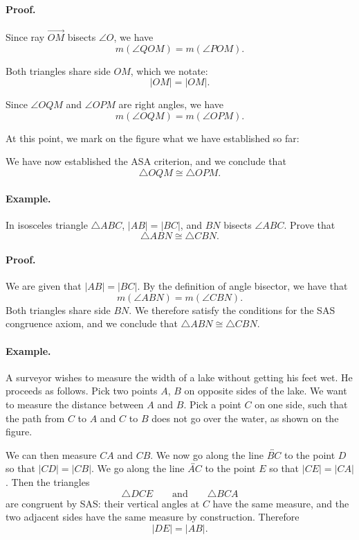 \documentclass[12pt]{book} %
\begin{document}

\paragraph{Proof.}
Since ray $\overrightarrow{OM}$ bisects $\angle O$, we have
\[
m(\angle QOM)=m(\angle POM).
\]

Both triangles share side $OM$, which we notate:
\[
|OM|=|OM|.
\]

Since $\angle OQM$ and $\angle OPM$ are right angles, we have
\[
m(\angle OQM)=m(\angle OPM).
\]

At this point, we mark on the figure what we have established so far:


We have now established the ASA criterion, and we conclude that
\[
\triangle OQM\cong\triangle OPM.
\]

\paragraph{Example.}
In isosceles triangle $\triangle ABC$, $|AB|=|BC|$, and $BN$ bisects $\angle ABC$. Prove that
\[
\triangle ABN\cong\triangle CBN.
\]


\paragraph{Proof.}
We are given that $|AB|=|BC|$. By the definition of angle bisector, we have that
\[
m(\angle ABN)=m(\angle CBN).
\]
Both triangles share side $BN$. We therefore satisfy the conditions for the SAS congruence axiom, and we conclude that $\triangle ABN\cong\triangle CBN$.

\paragraph{Example.}
A surveyor wishes to measure the width of a lake without getting his feet wet. He proceeds as follows. Pick two points $A$, $B$ on opposite sides of the lake. We want to measure the distance between $A$ and $B$. Pick a point $C$ on one side, such that the path from $C$ to $A$ and $C$ to $B$ does not go over the water, as shown on the figure.


We can then measure $CA$ and $CB$. We now go along the line $\overleftrightarrow{BC}$ to the point $D$ so that $|CD|=|CB|$. We go along the line $\overleftrightarrow{AC}$ to the point $E$ so that $|CE|=|CA|$. Then the triangles
\[
\triangle DCE
\qquad \text{and} \qquad
\triangle BCA
\]
are congruent by SAS: their vertical angles at $C$ have the same measure, and the two adjacent sides have the same measure by construction. Therefore
\[
|DE|=|AB|.
\]
\end{document}
